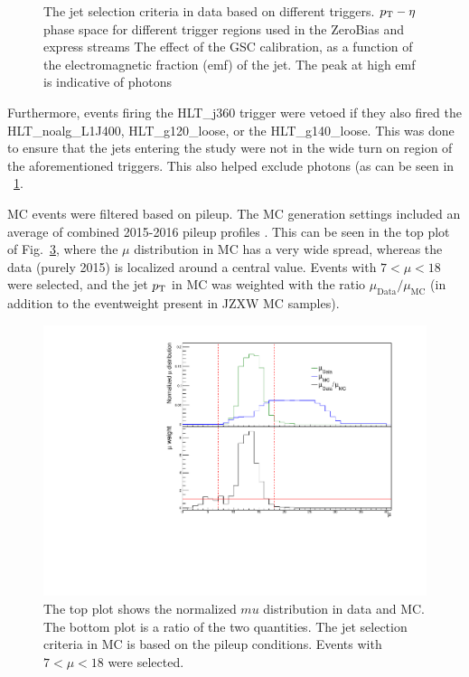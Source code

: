 \begin{figure}
\begin{subfigure}[b]{\textwidth}
    \caption{}
    \label{selection_2}
\end{subfigure}\hfill
   \caption{The jet selection criteria in data based on different triggers. \protect{} $\mbox{$p_{\mathrm{T}}$}-\eta$ phase space for different trigger regions used in the ZeroBias and express streams \protect{}The effect of the GSC calibration, as a function of the electromagnetic fraction (emf) of the jet. The peak at high emf is indicative of photons }
\label{fig:TrigMap}
\end{figure}

Furthermore, events firing the HLT\_j360 trigger were vetoed if they also fired the HLT\_noalg\_L1J400, HLT\_g120\_loose, or the HLT\_g140\_loose. This was done to ensure that the jets entering the study were not in the wide turn on region of the aforementioned triggers. This also helped exclude photons (as can be seen in ~\ref{selection_2}.


MC events were filtered based on pileup. The MC generation settings included an average of combined 2015-2016 pileup profiles \cite{twiki_MC15c}. This can be seen in the top plot of Fig.~\ref{fig:mu_weight}, where the $\mu$ distribution in MC has a very wide spread, whereas the data (purely 2015) is localized around a central value. Events with $7 < \mu < 18$ were selected, and the jet $\mbox{$p_{\mathrm{T}}$}$ in MC was weighted with the ratio $\mu_{\mathrm{Data}}/\mu_{\mathrm{MC}}$ (in addition to the eventweight present in JZXW MC samples).



\begin{figure}
	\centering
	\includegraphics[width=1.0\textwidth]{figures/qualification/mu_weight.pdf}
	\caption{The top plot shows the normalized $mu$ distribution in data and MC. The bottom plot is a ratio of the two quantities. The jet selection criteria in MC is based on the pileup conditions. Events with $7 < \mu < 18$ were selected. }%
	\label{fig:mu_weight}%
\end{figure}

